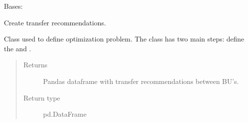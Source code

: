 \documentclass[letterpaper,10pt,english]{sphinxmanual}
\begin{document}
\begin{fulllineitems}
\label{\detokenize{source/optimization.model:optimization.model.optimizer.OptimizationModel}}
Bases: {\hyperref[\detokenize{source/optimization.model:optimization.model.optimizer.ObjectiveFunction}]{}}

Create transfer recommendations.

Class used to define optimization problem. The class has two main steps: define the  and .
\begin{quote}\begin{description}
\item[{Returns}] \leavevmode
Pandas dataframe with transfer recommendations between BU’s.

\item[{Return type}] \leavevmode
pd.DataFrame

\end{description}\end{quote}

\begin{fulllineitems}
\label{\detokenize{source/optimization.model:optimization.model.optimizer.OptimizationModel.EXTRA_COLUMNS}}
\end{fulllineitems}


\begin{fulllineitems}
\label{\detokenize{source/optimization.model:optimization.model.optimizer.OptimizationModel.EXTRA_ROWS}}
\end{fulllineitems}


\end{fulllineitems}
\end{document}
